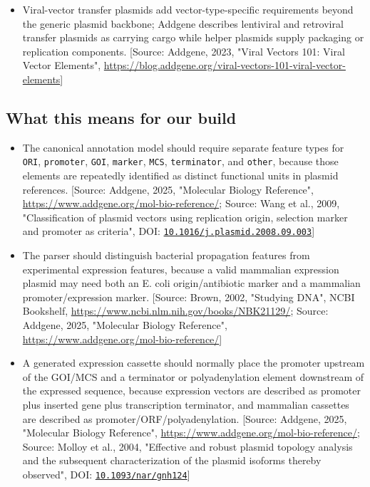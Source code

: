 \documentclass[11pt]{report}
\begin{document}
\begin{itemize}
\item Viral-vector transfer plasmids add vector-type-specific requirements beyond the generic plasmid backbone; Addgene describes lentiviral and retroviral transfer plasmids as carrying cargo while helper plasmids supply packaging or replication components. [Source: Addgene, 2023, "Viral Vectors 101: Viral Vector Elements", \url{https://blog.addgene.org/viral-vectors-101-viral-vector-elements}]
\end{itemize}

\subsection{What this means for our build}
\begin{itemize}
\item The canonical annotation model should require separate feature types for \texttt{ORI}, \texttt{promoter}, \texttt{GOI}, \texttt{marker}, \texttt{MCS}, \texttt{terminator}, and \texttt{other}, because those elements are repeatedly identified as distinct functional units in plasmid references. [Source: Addgene, 2025, "Molecular Biology Reference", \url{https://www.addgene.org/mol-bio-reference/}; Source: Wang et al., 2009, "Classification of plasmid vectors using replication origin, selection marker and promoter as criteria", DOI: \href{https://doi.org/10.1016/j.plasmid.2008.09.003}{\nolinkurl{10.1016/j.plasmid.2008.09.003}}]
\item The parser should distinguish bacterial propagation features from experimental expression features, because a valid mammalian expression plasmid may need both an E. coli origin/antibiotic marker and a mammalian promoter/expression marker. [Source: Brown, 2002, "Studying DNA", NCBI Bookshelf, \url{https://www.ncbi.nlm.nih.gov/books/NBK21129/}; Source: Addgene, 2025, "Molecular Biology Reference", \url{https://www.addgene.org/mol-bio-reference/}]
\item A generated expression cassette should normally place the promoter upstream of the GOI/MCS and a terminator or polyadenylation element downstream of the expressed sequence, because expression vectors are described as promoter plus inserted gene plus transcription terminator, and mammalian cassettes are described as promoter/ORF/polyadenylation. [Source: Addgene, 2025, "Molecular Biology Reference", \url{https://www.addgene.org/mol-bio-reference/}; Source: Molloy et al., 2004, "Effective and robust plasmid topology analysis and the subsequent characterization of the plasmid isoforms thereby observed", DOI: \href{https://doi.org/10.1093/nar/gnh124}{\nolinkurl{10.1093/nar/gnh124}}]

\end{itemize}
\end{document}
